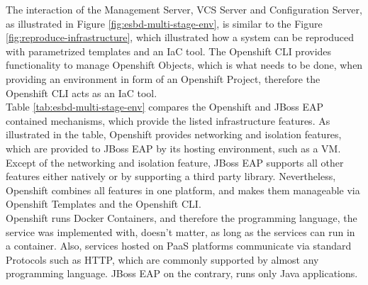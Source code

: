 The interaction of the Management Server, VCS Server and Configuration Server, as illustrated in Figure \vref{fig:esbd-multi-stage-env}, is similar to the Figure \vref{fig:reproduce-infrastructure}, which illustrated how a system can be reproduced with parametrized templates and an IaC tool. The Openshift CLI provides functionality to manage Openshift Objects, which is what needs to be done, when providing an environment in form of an Openshift Project, therefore the Openshift CLI acts as an IaC tool.  \\

Table \vref{tab:esbd-multi-stage-env} compares the Openshift and JBoss EAP contained mechanisms, which provide the listed infrastructure features. As illustrated in the table, Openshift provides networking and isolation features, which are provided to JBoss EAP by its hosting environment, such as a VM. Except of the networking and isolation feature, JBoss EAP supports all other features either natively or by supporting a third party library. Nevertheless, Openshift combines all features in one platform, and makes them manageable via Openshift Templates and the Openshift CLI. \\

Openshift runs Docker Containers, and therefore the programming language, the service was implemented with, doesn't matter, as long as the services can run in a container. Also, services hosted on PaaS platforms communicate via standard Protocols such as HTTP, which are commonly supported by almost any programming language. JBoss EAP on the contrary, runs only Java applications.
\newpage

